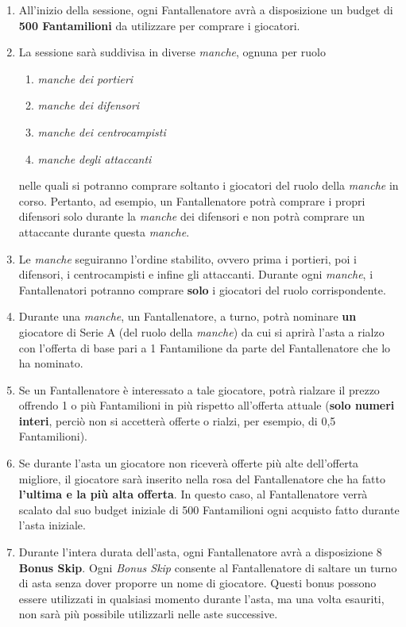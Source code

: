\documentclass[12pt]{article}
\begin{document}
\begin{enumerate}
\item All'inizio della sessione, ogni Fantallenatore avrà a disposizione un budget di \textbf{500 Fantamilioni} da utilizzare per comprare i giocatori.
\item La sessione sarà suddivisa in diverse \textit{\textit{manche}}, ognuna per ruolo \begin{enumerate}
    \item \textit{\textit{manche} dei portieri}
    \item \textit{\textit{manche} dei difensori}
    \item \textit{\textit{manche} dei centrocampisti}
    \item \textit{\textit{manche} degli attaccanti}
\end{enumerate} nelle quali si potranno comprare soltanto i giocatori del ruolo della \textit{manche} in corso. Pertanto, ad esempio, un Fantallenatore potrà comprare i propri difensori solo durante la \textit{manche} dei difensori e non potrà comprare un attaccante durante questa \textit{manche}.
\item Le \textit{manche} seguiranno l'ordine stabilito, ovvero prima i portieri, poi i difensori, i centrocampisti e infine gli attaccanti. Durante ogni \textit{manche}, i Fantallenatori potranno comprare \textbf{solo} i giocatori del ruolo corrispondente.
\item Durante una \textit{manche}, un Fantallenatore, a turno, potrà nominare \textbf{un} giocatore di Serie A (del ruolo della \textit{manche}) da cui si aprirà l'asta a rialzo con l'offerta di base pari a 1 Fantamilione da parte del Fantallenatore che lo ha nominato.
\item Se un Fantallenatore è interessato a tale giocatore, potrà rialzare il prezzo offrendo 1 o più Fantamilioni in più rispetto all'offerta attuale (\textbf{solo numeri interi}, perciò non si accetterà offerte o rialzi, per esempio, di 0,5 Fantamilioni).
\item Se durante l'asta un giocatore non riceverà offerte più alte dell'offerta migliore, il giocatore sarà inserito nella rosa del Fantallenatore che ha fatto \textbf{ l'ultima e la più alta offerta}. In questo caso, al Fantallenatore verrà scalato dal suo budget iniziale di 500 Fantamilioni ogni acquisto fatto durante l'asta iniziale.
\item Durante l'intera durata dell'asta, ogni Fantallenatore avrà a disposizione 8 \textbf{Bonus Skip}. Ogni \textit{Bonus Skip} consente al Fantallenatore di saltare un turno di asta senza dover proporre un nome di giocatore. Questi bonus possono essere utilizzati in qualsiasi momento durante l'asta, ma una volta esauriti, non sarà più possibile utilizzarli nelle aste successive.

\end{enumerate}
\end{document}
